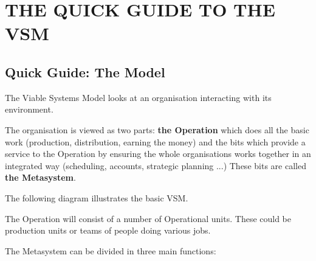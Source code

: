 \chapter{THE QUICK GUIDE TO THE VSM}\label{THE QUICK GUIDE TO THE VSM}
\noindent{}

\section*{Quick Guide: The Model}
The Viable Systems Model looks at an organisation interacting with its environment.

The organisation is viewed as two parts: \textbf{the Operation} which does all the basic work (production, distribution, earning the money) and the bits which provide a service to the Operation by ensuring the whole organisations works together in an integrated way (scheduling, accounts, strategic planning ...) These bits are called \textbf{the Metasystem}.

The following diagram illustrates the basic VSM.

The Operation will consist of a number of Operational units. These could be production units or teams of people doing various jobs.

The Metasystem can be divided in three main functions:


